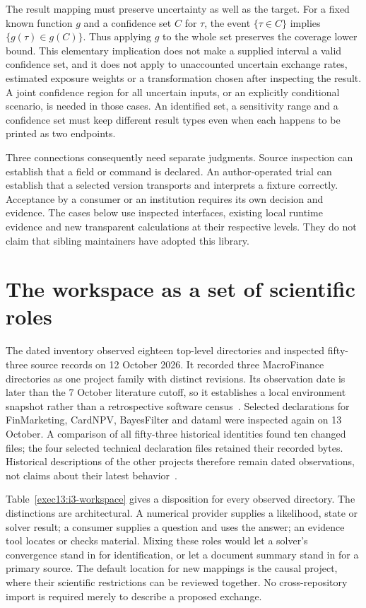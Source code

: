 The result mapping must preserve uncertainty as well as the target. For a
fixed known function $g$ and a confidence set $C$ for $\tau$, the event
$\{\tau\in C\}$ implies $\{g(\tau)\in g(C)\}$. Thus applying $g$ to the
whole set preserves the coverage lower bound. This elementary implication
does not make a supplied interval a valid confidence set, and it does not
apply to unaccounted uncertain exchange rates, estimated exposure weights or
a transformation chosen after inspecting the result. A joint confidence
region for all uncertain inputs, or an explicitly conditional scenario, is
needed in those cases. An identified set, a sensitivity range and a confidence
set must keep different result types even when each happens to be printed as
two endpoints.

Three connections consequently need separate judgments. Source inspection can
establish that a field or command is declared. An author-operated trial can
establish that a selected version transports and interprets a fixture
correctly. Acceptance by a consumer or an institution requires its own
decision and evidence. The cases below use inspected interfaces, existing
local runtime evidence and new transparent calculations at their respective
levels. They do not claim that sibling maintainers have adopted this library.

\section{The workspace as a set of scientific roles}

The dated inventory observed eighteen top-level directories and inspected
fifty-three source records on 12 October 2026. It recorded three MacroFinance
directories as one project family with distinct revisions. Its observation
date is later than the 7 October literature cutoff, so it establishes a local
environment snapshot rather than a retrospective software census~\citep{v12_in_inventory}. Selected declarations for FinMarketing, CardNPV,
BayesFilter and dataml were inspected again on 13 October. A comparison of all
fifty-three historical identities found ten changed files; the four selected
technical declaration files retained their recorded bytes. Historical
descriptions of the other projects therefore remain dated observations, not
claims about their latest behavior~\citep{exec13_i3_inspection}.

Table~\ref{exec13:i3-workspace} gives a disposition for every observed
directory. The distinctions are architectural. A numerical provider supplies
a likelihood, state or solver result; a consumer supplies a question and uses
the answer; an evidence tool locates or checks material. Mixing these roles
would let a solver's convergence stand in for identification, or let a document
summary stand in for a primary source. The default location for new mappings
is the causal project, where their scientific restrictions can be reviewed
together. No cross-repository import is required merely to describe a proposed
exchange.

